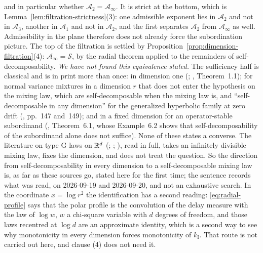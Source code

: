 \begin{remark}
and in particular whether $\mathcal{A}_2 = \mathcal{A}_\infty$. It is strict at the bottom, which
is Lemma~\ref{lem:filtration-strictness}(3): one admissible exponent lies in $\mathcal{A}_2$ and
not in $\mathcal{A}_3$, another in $\mathcal{A}_1$ and not in $\mathcal{A}_2$, and the first
separates $\mathcal{A}_2$ from $\mathcal{A}_\infty$ as well. Admissibility in the
plane therefore does not already force the subordination picture. The top of the filtration is settled by Proposition~\ref{prop:dimension-filtration}(4):
$\mathcal{A}_\infty = \mathcal{S}$, by the radial theorem applied to the remainders of
self-decomposability. \emph{We have not found this equivalence stated.} The sufficiency half is classical and is in
print more than once: in dimension one (; ,
Theorem~1.1); for normal variance mixtures in a dimension $r$ that does not enter the hypothesis
on the mixing law, which are self-decomposable when the mixing law is, and ``self-decomposable in
any dimension'' for the generalized hyperbolic family at zero drift
(, pp.~147 and~149); and in a fixed dimension for an
operator-stable subordinand (, Theorem~6.1, whose
Example~6.2 shows that self-decomposability of the subordinand alone does not suffice). None of
these states a converse. The literature on type G laws on $\mathbb{R}^d$
(; ;
), read in full, takes an infinitely divisible mixing law, fixes the
dimension, and does not treat the question. So the direction from self-decomposability in every
dimension to a self-decomposable mixing law is, as far as these sources go, stated here for the
first time; the sentence records what was read, on 2026-09-19 and 2026-09-20, and not an
exhaustive search. In the coordinate $x = \log r^2$ the identification has a
second reading:
\ref{eq:radial-profile} says that the polar profile is the convolution of the delay measure with
the law of $\log w$, $w$ a chi-square variable with $d$ degrees of freedom, and those laws
recentred at $\log d$ are an approximate identity, which is a second way to see why monotonicity in every dimension forces monotonicity of $k_{\mathrm I}$. That route is not carried out here, and clause (4) does not need it.


\end{remark}
